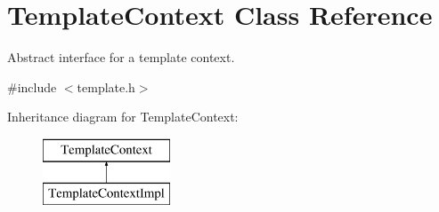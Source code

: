 \hypertarget{class_template_context}{}\section{Template\+Context Class Reference}
\label{class_template_context}


Abstract interface for a template context.  




{\ttfamily \#include $<$template.\+h$>$}

Inheritance diagram for Template\+Context\+:\begin{figure}[H]
\begin{center}
\leavevmode
\includegraphics[height=2.000000cm]{class_template_context}
\end{center}
\end{figure}
